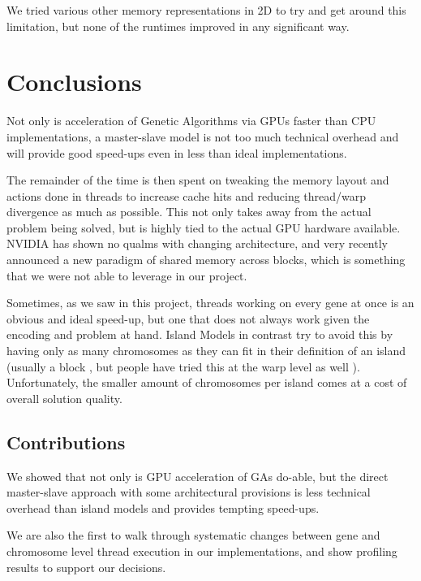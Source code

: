 \documentclass[11pt]{article}       %
\begin{document}
We tried various other memory representations in 2D to try and get around this limitation, but none of the runtimes improved in any significant way.

\section{Conclusions} \label{conc}

Not only is acceleration of Genetic Algorithms via GPUs faster than CPU implementations, a master-slave model is not too much technical overhead and will provide good speed-ups even in less than ideal implementations.

The remainder of the time is then spent on tweaking the memory layout and actions done in threads to increase cache hits and reducing thread/warp divergence as much as possible. This not only takes away from the actual problem being solved, but is highly tied to the actual GPU hardware available. NVIDIA has shown no qualms with changing architecture, and very recently announced a new paradigm of shared memory across blocks, which is something that we were not able to leverage in our project.

Sometimes, as we saw in this project, threads working on every gene at once is an obvious and ideal speed-up, but one that does not always work given the encoding and problem at hand. Island Models in contrast try to avoid this by having only as many chromosomes as they can fit in their definition of an island (usually a block \cite{Janssen2022-kr}, but people have tried this at the warp level as well \cite{Amin2022-xd}). Unfortunately, the smaller amount of chromosomes per island comes at a cost of overall solution quality.

\subsection{Contributions}
We showed that not only is GPU acceleration of GAs do-able, but the direct master-slave approach with some architectural provisions is less technical overhead than island models and provides tempting speed-ups. 

We are also the first to walk through systematic changes between gene and chromosome level thread execution in our implementations, and show profiling results to support our decisions.
\end{document}
